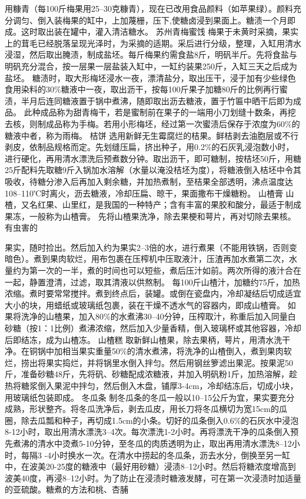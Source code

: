 \documentclass{ctexbook}
\begin{document}
用糠青（每100斤梅果用25--30克糠青），现在已改用食品颜料（如苹果绿）。颜料充分调匀、倒入装梅果的缸中，上加蔑栅，压下,使糖卤浸到果面上。糖渍一个月即成。这时取出装在罐中，灌入清洁糖水。
苏州青梅蜜饯
梅果于未黄时采摘，果实上的茸毛已经脱落呈现光泽时，为采摘的适期。采后进行分级，整理，入缸用清水浸湿，然后取出腌渍，制成盐坯。每斤梅果约需食盐8斤，明矾半斤。先将食盐与明矾充分混合，按一层果一层盐装入缸中，一缸约装果250斤，入缸三天之后成为盐坯。
糖渍时，取大形梅坯浸水一夜，漂清盐分，取出压干，浸于加有少些绿色食用染料的30\%糖液中一夜，取出沥干，按每100斤果子加糖80斤的比例再行蜜渍，半月后连同糖液置于锅中煮沸，随即取出沥去糖液，置于竹匾中晒干后即为成品。
此种成品称为甜青梅干，若是蜜制前在果子的一端用小刀划缝十数条，再挖去核，则制成品称为手梅。若用小形梅坯，经过第一次蜜渍后保存于浓度为60\%的糖液中者，称为雨梅。
桔饼
选用新鲜无生霉腐烂的桔果。鲜桔剥去油胞层或不行剥皮，依制品规格而定。先划缝压扁，挤出种子，用0.2\%的石灰乳浸泡数小时，进行硬化，再用清水漂洗后预煮数分钟。取出沥干，即可糖制，按桔坯50斤，用糖25斤配料先取糖9斤入锅加水溶解（水量以淹没桔坯为度），将糖液倒入桔坯中令其吸收，待糖分渗入后再加入剩余糖，并加热煮制，至桔果全部透明，沸点温度达108--110℃时离火，沥去糖液，冷却压扁、晾干，果面撒布干燥糖粉。
山楂膏
山楂，又名红果、山里红，是我国的一种特产；含有丰富的果胶和酸分，最适于制成果冻，一般称为山楂膏。
先将山楂果洗净，除去果梗和萼片，再对切除去果核。有虫害的

果实，随时捡出。然后加入约为果实2--3倍的水，进行煮果（不能用铁锅，否则变暗色）。煮到果肉软烂，用布包裹在压榨机中压取液汁，压渣再加水煮第二次，水量约为第一次的一半，煮的时间也可以短些，煮后压汁如前。两次所得的液汁合在一起，静置澄清，过滤，取其清液以供熬制。
每100斤山楂汁，加糖约75斤，加热浓缩。煮时要常常搅拌。煮到终点后，装罐。或倒在瓷盘内，冷却凝结后切成适宜大小的块，用蜡纸或玻璃纸包裹，装在干燥不透水气的容器内，即成山楂膏。
如果将洗净的山楂果，加入80\%的水煮沸30--40分钟，压榨取汁，称重后加入同量白砂糖（按1：1比例）煮沸浓缩，然后加入少量香精，倒入玻璃杯或其他容器，冷却后即结冻，成为山楂冻。
山楂糕
取新鲜山楂果，除去果柄，萼片，用清水洗干净。在铜锅中加相当果实重量50\%的清水煮沸，将洗净的山楂倒入，煮到果肉软烂，捞出将果实捣烂，并将锅里水倒入拌匀。然后用钢丝箩滤出果泥。按果泥50斤，准备砂糖48斤，先将矾、砂糖配成浓糖液，并加入明矾粉1斤，加热溶解，趁热将糖浆倒入果泥中拌匀，然后倒入木盘，铺厚3-4cm，冷却结冻后，切成小块，用玻璃纸包装即成。
冬瓜条
制冬瓜条的冬瓜一般以10--15公斤为宜，果实要充分成熟，形状整齐。将冬瓜洗净后，剥去瓜皮，用长刀将冬瓜横切为宽15cm的瓜圈，除去瓜瓢和种子，再切成1.5cm的小条。切好的瓜条倒入0.6\%的石灰水中浸泡8-12小时，取出用清水漂洗3--4次。每次漂洗1-2小时。再将漂洗干净的瓜条倒入预先煮沸的清水中烫煮5-10分钟，至冬瓜的肉质透明为止，取出再用清水漂洗8--12小时，每隔3
-4小时换水一次。在清水中捞起的冬瓜条，沥去水分，倒换至另一缸中，在波美20-25度的糖液中（最好用砂糖）浸渍8--12小时。然后将糖浓度增高到波美40度，再浸8--12小时。为了防止在浸渍时糖液发酵，可在第一次浸渍时加适量的亚硫酸。糖煮的方法和桃、杏脯
\end{document}
